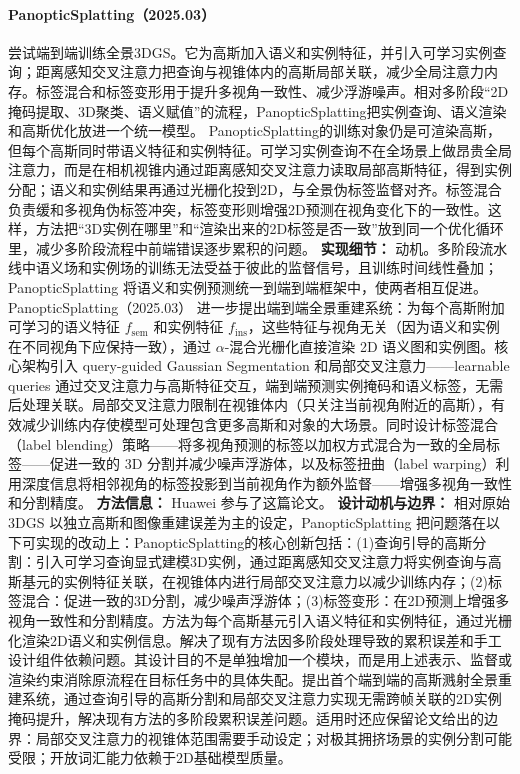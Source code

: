 \paragraph{PanopticSplatting（2025.03）\cite{2503_18073}}
尝试端到端训练全景3DGS。它为高斯加入语义和实例特征，并引入可学习实例查询；距离感知交叉注意力把查询与视锥体内的高斯局部关联，减少全局注意力内存。标签混合和标签变形用于提升多视角一致性、减少浮游噪声。相对多阶段“2D掩码提取、3D聚类、语义赋值”的流程，PanopticSplatting把实例查询、语义渲染和高斯优化放进一个统一模型。
PanopticSplatting的训练对象仍是可渲染高斯，但每个高斯同时带语义特征和实例特征。可学习实例查询不在全场景上做昂贵全局注意力，而是在相机视锥内通过距离感知交叉注意力读取局部高斯特征，得到实例分配；语义和实例结果再通过光栅化投到2D，与全景伪标签监督对齐。标签混合负责缓和多视角伪标签冲突，标签变形则增强2D预测在视角变化下的一致性。这样，方法把“3D实例在哪里”和“渲染出来的2D标签是否一致”放到同一个优化循环里，减少多阶段流程中前端错误逐步累积的问题。
\textbf{实现细节：} 动机。多阶段流水线中语义场和实例场的训练无法受益于彼此的监督信号，且训练时间线性叠加；PanopticSplatting 将语义和实例预测统一到端到端框架中，使两者相互促进。PanopticSplatting（2025.03） 进一步提出端到端全景重建系统：为每个高斯附加可学习的语义特征 $f_\mathrm{sem}$ 和实例特征 $f_\mathrm{ins}$，这些特征与视角无关（因为语义和实例在不同视角下应保持一致），通过 $\alpha$-混合光栅化直接渲染 2D 语义图和实例图。核心架构引入 query-guided Gaussian Segmentation 和局部交叉注意力——learnable queries 通过交叉注意力与高斯特征交互，端到端预测实例掩码和语义标签，无需后处理关联。局部交叉注意力限制在视锥体内（只关注当前视角附近的高斯），有效减少训练内存使模型可处理包含更多高斯和对象的大场景。同时设计标签混合（label blending）策略——将多视角预测的标签以加权方式混合为一致的全局标签——促进一致的 3D 分割并减少噪声浮游体，以及标签扭曲（label warping）利用深度信息将相邻视角的标签投影到当前视角作为额外监督——增强多视角一致性和分割精度。
\textbf{方法信息：} Huawei 参与了这篇论文。
\textbf{设计动机与边界：} 相对原始 3DGS 以独立高斯和图像重建误差为主的设定，PanopticSplatting 把问题落在以下可实现的改动上：PanopticSplatting的核心创新包括：(1)查询引导的高斯分割：引入可学习查询显式建模3D实例，通过距离感知交叉注意力将实例查询与高斯基元的实例特征关联，在视锥体内进行局部交叉注意力以减少训练内存；(2)标签混合：促进一致的3D分割，减少噪声浮游体；(3)标签变形：在2D预测上增强多视角一致性和分割精度。方法为每个高斯基元引入语义特征和实例特征，通过光栅化渲染2D语义和实例信息。解决了现有方法因多阶段处理导致的累积误差和手工设计组件依赖问题。其设计目的不是单独增加一个模块，而是用上述表示、监督或渲染约束消除原流程在目标任务中的具体失配。提出首个端到端的高斯溅射全景重建系统，通过查询引导的高斯分割和局部交叉注意力实现无需跨帧关联的2D实例掩码提升，解决现有方法的多阶段累积误差问题。适用时还应保留论文给出的边界：局部交叉注意力的视锥体范围需要手动设定；对极其拥挤场景的实例分割可能受限；开放词汇能力依赖于2D基础模型质量。

